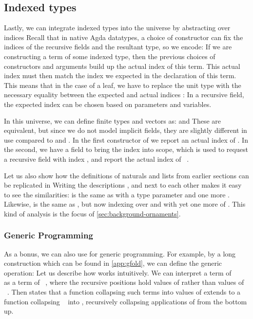 \subsection{Indexed types}\label{ssec:background-ix}
Lastly, we can integrate indexed types \cite{iir} into the universe by abstracting over indices
Recall that in native Agda datatypes, a choice of constructor can fix the indices of the recursive fields and the resultant type, so we encode:
If we are constructing a term of some indexed type, then the previous choices of constructors and arguments build up the actual index of this term. This actual index must then match the index we expected in the declaration of this term. This means that in the case of a leaf, we have to replace the unit type with the necessary equality between the expected and actual indices \cite{algorn}:
In a recursive field, the expected index can be chosen based on parameters and variables. %

In this universe, we can define finite types and vectors as:
and
These are equivalent, but since we do not model implicit fields, they are slightly different in use compared to  and . In the first constructor of  we report an actual index of . In the second, we have a field \bN{} to bring the index  into scope, which is used to request a recursive field with index , and report the actual index of \ . 

Let us also show how the definitions of naturals and lists from earlier sections can be replicated in 
Writing the descriptions ,  and  next to each other makes it easy to see the similarities:  is the same as  with a type parameter and one more . Likewise,  is the same as , but now indexing over \bN{} and with yet one more  of \bN{}. This kind of analysis is the focus of \autoref{sec:background-ornaments}.

\subsubsection{Generic Programming}
As a bonus, we can also use  for generic programming. For example, by a long construction which can be found in \autoref{app:gfold}, we can define the generic  operation:
Let us describe how  works intuitively. We can interpret a term of \ \ \  as a term of \ , where the recursive positions hold values of  rather than values of \ . Then  states that a function collapsing such terms into values of  extends to a function collapsing \  into , recursively collapsing applications of  from the bottom up.

